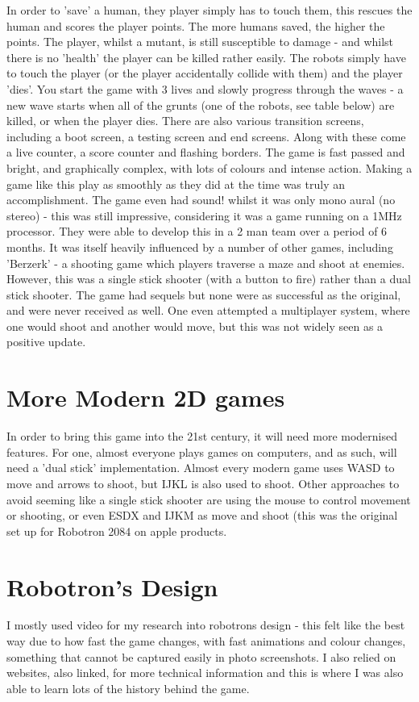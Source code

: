 In order to 'save' a human, they player simply has to touch them, this rescues the human and scores the player points. The more humans saved, the higher the points. The player, whilst a mutant, is still susceptible to damage - and whilst there is no 'health' the player can be killed rather easily. The robots simply have to touch the player (or the player accidentally collide with them) and the player 'dies'. You start the game with 3 lives and slowly progress through the waves - a new wave starts when all of the grunts (one of the robots, see table below) are killed, or when the player dies. 
There are also various transition screens, including a boot screen, a testing screen and end screens. Along with these come a live counter, a score counter and flashing borders. The game is fast passed and bright, and graphically complex, with lots of colours and intense action. Making a game like this play as smoothly as they did at the time was truly an accomplishment.
The game even had sound! whilst it was only mono aural (no stereo) - this was still impressive, considering it was a game running on a 1MHz processor. They were able to develop this in a 2 man team over a period of 6 months. It was itself heavily influenced by a number of other games, including 'Berzerk' - a shooting game which players traverse a maze and shoot at enemies. However, this was a single stick shooter (with a button to fire) rather than a dual stick shooter.
The game had sequels but none were as successful as the original, and were never received as well. One even attempted a multiplayer system, where one would shoot and another would move, but this was not widely seen as a positive update.

\section{More Modern 2D games}
In order to bring this game into the 21st century, it will need more modernised features. For one, almost everyone plays games on computers, and as such, will need a 'dual stick' implementation. Almost every modern game uses WASD to move and arrows to shoot, but IJKL is also used to shoot. Other approaches to avoid seeming like a single stick shooter are using the mouse to control movement or shooting, or even ESDX and IJKM as move and shoot (this was the original set up for Robotron 2084 on apple products. 

\section{Robotron's Design}
I mostly used video for my research into robotrons design - this felt like the best way due to how fast the game changes, with fast animations and colour changes, something that cannot be captured easily in photo screenshots. I also relied on websites, also linked, for more technical information and this is where I was also able to learn lots of the history behind the game.


